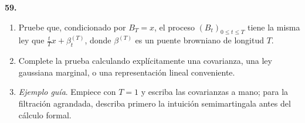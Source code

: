 \documentclass[11pt, letterpaper]{article}
\begin{document}
\newpage
\begin{ejercicio}
    \textbf{59.} 
    \begin{enumerate}
        \item Pruebe que, condicionado por $B_T=x$, el proceso $(B_t)_{0\le t\le T}$ tiene la misma ley que $\frac{t}{T}x+\beta_t^{(T)}$, donde $\beta^{(T)}$ es un puente browniano de longitud $T$.
        \item Complete la prueba calculando explícitamente una covarianza, una ley gaussiana marginal, o una representación lineal conveniente.
        \item \textit{Ejemplo guía}. Empiece con $T=1$ y escriba las covarianzas a mano; para la filtración agrandada, describa primero la intuición semimartingala antes del cálculo formal.
    \end{enumerate}
\end{ejercicio}

\vspace{5mm}
\end{document}
